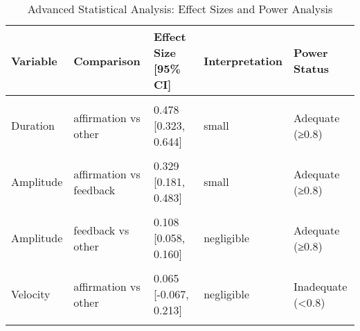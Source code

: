 \begin{table}[!h]
\centering
\caption{Advanced Statistical Analysis: Effect Sizes and Power Analysis}
\centering
\begin{tabular}[t]{lllll}
\toprule
Variable & Comparison & Effect Size [95\% CI] & Interpretation & Power Status\\
\midrule
\cellcolor{gray!10}{Duration} & \cellcolor{gray!10}{affirmation vs feedback} & \cellcolor{gray!10}{-0.221 [-0.315, -0.121]} & \cellcolor{gray!10}{small} & \cellcolor{gray!10}{Adequate (≥0.8)}\\
Duration & affirmation vs other & 0.478 [0.323, 0.644] & small & Adequate (≥0.8)\\
\cellcolor{gray!10}{Duration} & \cellcolor{gray!10}{feedback vs other} & \cellcolor{gray!10}{0.605 [0.560, 0.651]} & \cellcolor{gray!10}{medium} & \cellcolor{gray!10}{Adequate (≥0.8)}\\
Amplitude & affirmation vs feedback & 0.329 [0.181, 0.483] & small & Adequate (≥0.8)\\
\cellcolor{gray!10}{Amplitude} & \cellcolor{gray!10}{affirmation vs other} & \cellcolor{gray!10}{0.488 [0.316, 0.663]} & \cellcolor{gray!10}{small} & \cellcolor{gray!10}{Adequate (≥0.8)}\\
\addlinespace
Amplitude & feedback vs other & 0.108 [0.058, 0.160] & negligible & Adequate (≥0.8)\\
\cellcolor{gray!10}{Velocity} & \cellcolor{gray!10}{affirmation vs feedback} & \cellcolor{gray!10}{0.420 [0.257, 0.596]} & \cellcolor{gray!10}{small} & \cellcolor{gray!10}{Adequate (≥0.8)}\\
Velocity & affirmation vs other & 0.065 [-0.067, 0.213] & negligible & Inadequate (<0.8)\\
\cellcolor{gray!10}{Velocity} & \cellcolor{gray!10}{feedback vs other} & \cellcolor{gray!10}{-0.312 [-0.367, -0.259]} & \cellcolor{gray!10}{small} & \cellcolor{gray!10}{Adequate (≥0.8)}\\
\bottomrule
\end{tabular}
\end{table}
